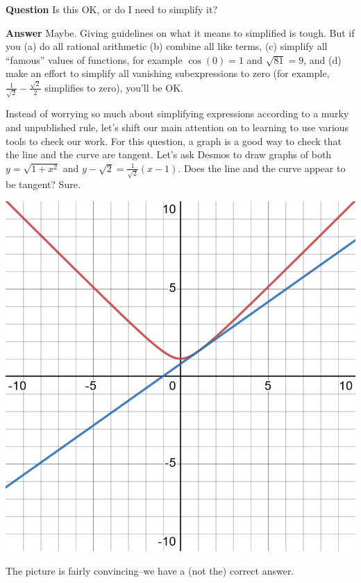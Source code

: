 \documentclass[12pt,fleqn,answers]{exam}
\begin{document}
\begin{questions}
\begin{solution}[2.5in]
 \textbf{Question} Is this OK, or do I need to simplify it?

\textbf{Answer} Maybe. Giving guidelines on what it means to 
  simplified is tough. But if you  (a) do all rational arithmetic (b) combine
  all like terms, (c) simplify all ``famous'' values of functions, 
  for example $\cos(0)=1$ and $\sqrt{81} = 9$, and (d) make an effort
  to simplify all vanishing subexpressions to zero (for example, 
  $\frac{1}{\sqrt{2}} - \frac{\sqrt{2}}{2}$ simplifies to zero), you'll be OK.

\quad Instead of worrying so much about simplifying expressions according to a murky and 
unpublished rule, let's shift our
main attention on to learning to use various tools to check our work. For this question, a graph is a good way
to check that the line and the curve are tangent.   Let's ask Desmos to draw 
graphs of both $y=\sqrt{1+x^2}$ and $y - \sqrt{2} = \frac{1}{\sqrt{2}} (x-1)$. Does the line and the curve
appear to be tangent?  Sure.

    \centering
    \includegraphics[scale=0.2]{desmos-graph(44).png}

The picture is fairly convincing--we have a (not the) correct answer.


\end{solution}

\newpage


\end{questions}
\end{document}
